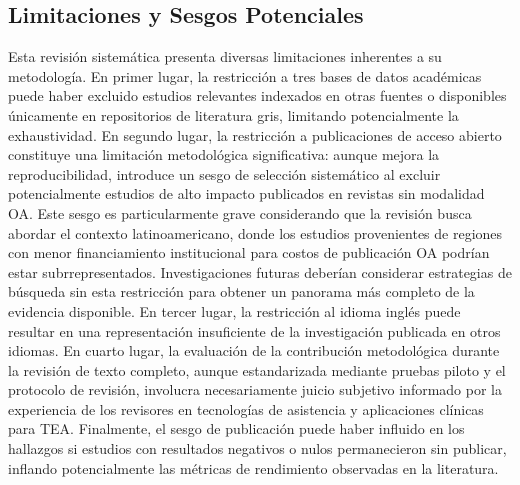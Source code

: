 \documentclass[ASNA,twocolumn]{USG}
\begin{document}
	\subsection{Limitaciones y Sesgos Potenciales}\label{sec2h}
	
	Esta revisión sistemática presenta diversas limitaciones inherentes a su
	metodología. En primer lugar, la restricción a tres bases de datos académicas
	puede haber excluido estudios relevantes indexados en otras fuentes o disponibles
	únicamente en repositorios de literatura gris, limitando potencialmente la
	exhaustividad. En segundo lugar, la restricción a publicaciones de acceso abierto
	constituye una limitación metodológica significativa: aunque mejora la
	reproducibilidad, introduce un sesgo de selección sistemático al excluir
	potencialmente estudios de alto impacto publicados en revistas sin modalidad OA.
	Este sesgo es particularmente grave considerando que la revisión busca abordar el
	contexto latinoamericano, donde los estudios provenientes de regiones con menor
	financiamiento institucional para costos de publicación OA podrían estar
	subrrepresentados. Investigaciones futuras deberían considerar estrategias de
	búsqueda sin esta restricción para obtener un panorama más completo de la
	evidencia disponible. En tercer lugar, la restricción al idioma inglés puede
	resultar en una representación insuficiente de la investigación publicada en otros
	idiomas. En cuarto lugar, la evaluación de la contribución metodológica durante
	la revisión de texto completo, aunque estandarizada mediante pruebas piloto y el
	protocolo de revisión, involucra necesariamente juicio subjetivo informado por la
	experiencia de los revisores en tecnologías de asistencia y aplicaciones clínicas
	para TEA. Finalmente, el sesgo de publicación puede haber influido en los
	hallazgos si estudios con resultados negativos o nulos permanecieron sin publicar,
	inflando potencialmente las métricas de rendimiento observadas en la literatura.
	
\end{document}
